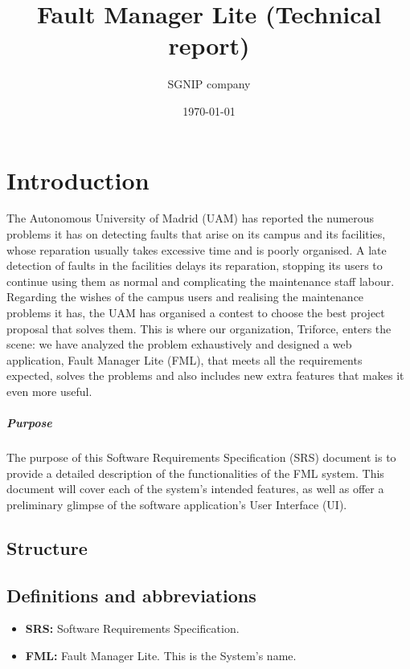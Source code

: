 \documentclass{report}
\title{Fault Manager Lite (Technical report)}
\date{\today}
\author{SGNIP company}
\begin{document}
\maketitle
\tableofcontents
\newpage
\begin{abstract}
\end{abstract}

\chapter{Introduction}

The Autonomous University of Madrid (UAM) has reported the numerous problems it has on detecting faults that arise on its campus and its facilities, whose reparation usually takes excessive time and is poorly organised. A late detection of faults in the facilities delays its reparation, stopping its users to continue using them as normal and complicating the maintenance staff labour. Regarding the wishes of the campus users and realising the maintenance problems it has, the UAM has organised a contest to choose the best project proposal that solves them.
This is where our organization, Triforce, enters the scene: we have analyzed the problem exhaustively and designed a web application, Fault Manager Lite (FML), that meets all the requirements expected, solves the problems and also includes new extra features that makes it even more useful.

\paragraph{Purpose} The purpose of this Software Requirements Specification (SRS) document is to provide a detailed description of the functionalities of the FML system. This document will cover each of the system's intended features, as well as offer a preliminary glimpse of the software application's User Interface (UI).

\section{Structure}

\section{Definitions and abbreviations}

\begin{itemize}
\item \textbf{SRS: } Software Requirements Specification.

\item \textbf{FML: } Fault Manager Lite. This is the System's name.

\end{itemize}
\end{document}
